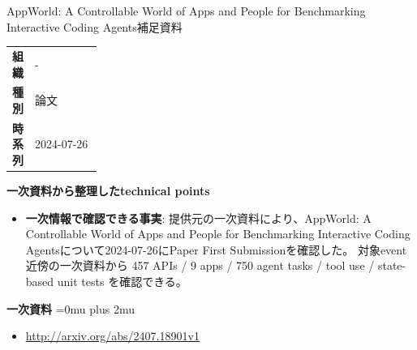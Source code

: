 \begin{technicalnote}{AppWorld: A Controllable World of Apps and People for Benchmarking Interactive Coding Agents}{補足資料}
\begingroup
\begin{tabularx}{\linewidth}{@{}>{\bfseries}p{0.22\linewidth}X@{}}
組織 & - \\
種別 & 論文 \\
時系列 & 2024-07-26 \\
\end{tabularx}
\smallskip
{\bfseries 一次資料から整理したtechnical points}
\begin{itemize}[leftmargin=1.5em,itemsep=0.35em]
\item \textbf{一次情報で確認できる事実}: 提供元の一次資料により、AppWorld: A Controllable World of Apps and People for Benchmarking Interactive Coding Agentsについて2024-07-26にPaper First Submissionを確認した。 対象event近傍の一次資料から 457 APIs / 9 apps / 750 agent tasks / tool use / state-based unit tests を確認できる。
\end{itemize}
\begin{minipage}{\linewidth}
\begin{samepage}
{\bfseries 一次資料}
\begingroup\sloppy
\Urlmuskip=0mu plus 2mu\relax
\begin{itemize}[leftmargin=1.5em,itemsep=0.25em]
\item {\scriptsize\url{http://arxiv.org/abs/2407.18901v1}}
\end{itemize}
\endgroup
\end{samepage}
\end{minipage}
\endgroup
\end{technicalnote}
\medskip

